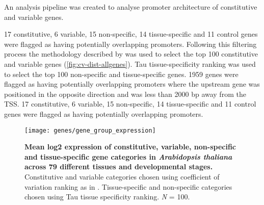\documentclass[../main.tex]{subfiles}
\begin{document}
An analysis pipeline was created to analyse promoter architecture of constitutive and variable genes.

17 constitutive, 6 variable, 15 non\hyp{}specific, 14 tissue\hyp{}specific and 11 control genes were flagged as having potentially overlapping promoters.
Following this filtering process the methodology described by \textcite{czechowskiGenomeWideIdentificationTesting2005} was used to select the top 100 constitutive and variable genes (\autoref{fig:cv-dist-allgenes}). Tau tissue\hyp{}specificity ranking was used to select the top 100  non\hyp{}specific and tissue\hyp{}specific genes.
1959 genes were flagged as having potentially overlapping promoters where the upstream gene was positioned in the opposite direction and was less than 2000 bp away from the TSS.
17 constitutive, 6 variable, 15 non\hyp{}specific, 14 tissue\hyp{}specific and 11 control genes were flagged as having potentially overlapping promoters.


\begin{figure}[hbt!]
	\begin{center}
		\capstart
		\texttt{[image: genes/gene\_group\_expression]}
		\caption{
			\textbf{Mean log2 expression of constitutive, variable, non\hyp{}specific and tissue\hyp{}specific gene categories in \textit{Arabidopsis thaliana} across 79 different tissues and developmental stages.}
			Constitutive and variable categories chosen using coefficient of variation ranking as in \textcite{czechowskiGenomeWideIdentificationTesting2005}.
			Tissue\hyp{}specific and non\hyp{}specific categories chosen using Tau tissue specificity ranking. \textit{N} = 100.				
			\label{fig:gene_group_expression}
		}
	\end{center}
\end{figure}
\end{document}
